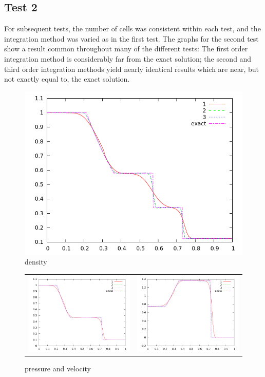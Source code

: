 \documentclass[letterpaper,12pt]{article}
\begin{document}
\subsection{Test 2}
For subsequent tests, the number of cells was consistent within each test, and the integration method was varied as in the first test. 
The graphs for the second test show a result common throughout many of the different tests: The first order integration method is considerably far from the exact solution; the second and third order integration methods yield nearly identical results which are near, but not exactly equal to, the exact solution. 
\begin{figure}[h]
  \begin{center}
     \includegraphics[width=.78\textwidth]{den_T2.png}	
  \end{center}
  \caption{density}
\end{figure}

\begin{figure}
  \begin{center}
	\begin{tabular}{cc}
      \includegraphics[width=.425\textwidth]{prs_T2.png} &
	  \includegraphics[width=.425\textwidth]{vel_T2.png}
	\end{tabular}
  \end{center}
  \caption{pressure and velocity}
\end{figure}
\end{document}
